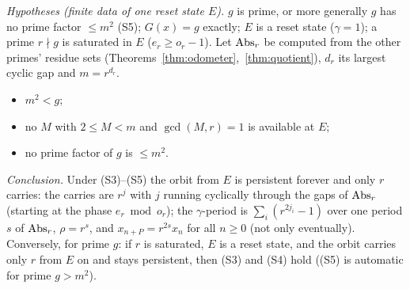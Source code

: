 \begin{theorem}\label{thm:certificate}
\emph{Hypotheses (finite data of one reset state \(E\)).} \(g\) is prime, or more generally \(g\) has no prime factor \(\le m^2\) \textup{(S5)}; \(G(x)=g\) exactly; \(E\) is a reset state (\(\gamma=1\)); a prime \(r\nmid g\) is saturated in \(E\) (\(e_r\ge o_r-1\)). Let \(\operatorname{Abs}_r\) be computed from the other primes' residue sets (Theorems~\ref{thm:odometer},~\ref{thm:quotient}), \(d_r\) its largest cyclic gap and \(m=r^{d_r}\).
\begin{itemize}[nosep]
\item[(S3)] \(m^2<g\);
\item[(S4)] no \(M\) with \(2\le M<m\) and \(\gcd(M,r)=1\) is available at \(E\);
\item[(S5)] no prime factor of \(g\) is \(\le m^2\).
\end{itemize}
\emph{Conclusion.} Under (S3)--(S5) the orbit from \(E\) is persistent forever and only \(r\) carries: the carries are \(r^j\) with \(j\) running cyclically through the gaps of \(\operatorname{Abs}_r\) (starting at the phase \(e_r\bmod o_r\)); the \(\gamma\)-period is \(\sum_i(r^{2j_i}-1)\) over one period \(s\) of \(\operatorname{Abs}_r\), \(\rho=r^s\), and \(x_{n+P}=r^{2s}x_n\) for all \(n\ge0\) (not only eventually). Conversely, for prime \(g\): if \(r\) is saturated, \(E\) is a reset state, and the orbit carries only \(r\) from \(E\) on and stays persistent, then (S3) and (S4) hold ((S5) is automatic for prime \(g>m^2\)).
\end{theorem}
